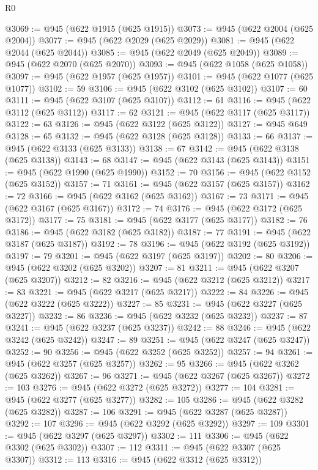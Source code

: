 \begin{lexlean}{R0}
\begin{coremodule}
@3069 := @945 (@622 @1915 (@625 @1915))
@3073 := @945 (@622 @2004 (@625 @2004))
@3077 := @945 (@622 @2029 (@625 @2029))
@3081 := @945 (@622 @2044 (@625 @2044))
@3085 := @945 (@622 @2049 (@625 @2049))
@3089 := @945 (@622 @2070 (@625 @2070))
@3093 := @945 (@622 @1058 (@625 @1058))
@3097 := @945 (@622 @1957 (@625 @1957))
@3101 := @945 (@622 @1077 (@625 @1077))
@3102 := 59
@3106 := @945 (@622 @3102 (@625 @3102))
@3107 := 60
@3111 := @945 (@622 @3107 (@625 @3107))
@3112 := 61
@3116 := @945 (@622 @3112 (@625 @3112))
@3117 := 62
@3121 := @945 (@622 @3117 (@625 @3117))
@3122 := 63
@3126 := @945 (@622 @3122 (@625 @3122))
@3127 := @945 @649
@3128 := 65
@3132 := @945 (@622 @3128 (@625 @3128))
@3133 := 66
@3137 := @945 (@622 @3133 (@625 @3133))
@3138 := 67
@3142 := @945 (@622 @3138 (@625 @3138))
@3143 := 68
@3147 := @945 (@622 @3143 (@625 @3143))
@3151 := @945 (@622 @1990 (@625 @1990))
@3152 := 70
@3156 := @945 (@622 @3152 (@625 @3152))
@3157 := 71
@3161 := @945 (@622 @3157 (@625 @3157))
@3162 := 72
@3166 := @945 (@622 @3162 (@625 @3162))
@3167 := 73
@3171 := @945 (@622 @3167 (@625 @3167))
@3172 := 74
@3176 := @945 (@622 @3172 (@625 @3172))
@3177 := 75
@3181 := @945 (@622 @3177 (@625 @3177))
@3182 := 76
@3186 := @945 (@622 @3182 (@625 @3182))
@3187 := 77
@3191 := @945 (@622 @3187 (@625 @3187))
@3192 := 78
@3196 := @945 (@622 @3192 (@625 @3192))
@3197 := 79
@3201 := @945 (@622 @3197 (@625 @3197))
@3202 := 80
@3206 := @945 (@622 @3202 (@625 @3202))
@3207 := 81
@3211 := @945 (@622 @3207 (@625 @3207))
@3212 := 82
@3216 := @945 (@622 @3212 (@625 @3212))
@3217 := 83
@3221 := @945 (@622 @3217 (@625 @3217))
@3222 := 84
@3226 := @945 (@622 @3222 (@625 @3222))
@3227 := 85
@3231 := @945 (@622 @3227 (@625 @3227))
@3232 := 86
@3236 := @945 (@622 @3232 (@625 @3232))
@3237 := 87
@3241 := @945 (@622 @3237 (@625 @3237))
@3242 := 88
@3246 := @945 (@622 @3242 (@625 @3242))
@3247 := 89
@3251 := @945 (@622 @3247 (@625 @3247))
@3252 := 90
@3256 := @945 (@622 @3252 (@625 @3252))
@3257 := 94
@3261 := @945 (@622 @3257 (@625 @3257))
@3262 := 95
@3266 := @945 (@622 @3262 (@625 @3262))
@3267 := 96
@3271 := @945 (@622 @3267 (@625 @3267))
@3272 := 103
@3276 := @945 (@622 @3272 (@625 @3272))
@3277 := 104
@3281 := @945 (@622 @3277 (@625 @3277))
@3282 := 105
@3286 := @945 (@622 @3282 (@625 @3282))
@3287 := 106
@3291 := @945 (@622 @3287 (@625 @3287))
@3292 := 107
@3296 := @945 (@622 @3292 (@625 @3292))
@3297 := 109
@3301 := @945 (@622 @3297 (@625 @3297))
@3302 := 111
@3306 := @945 (@622 @3302 (@625 @3302))
@3307 := 112
@3311 := @945 (@622 @3307 (@625 @3307))
@3312 := 113
@3316 := @945 (@622 @3312 (@625 @3312))

\end{coremodule}
\end{lexlean}
